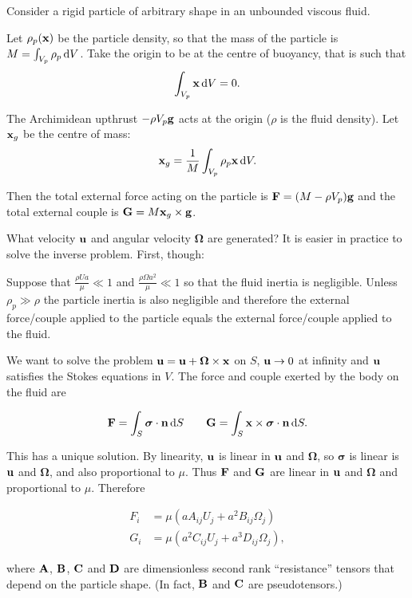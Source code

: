 \documentclass{notes}
\newcommand{\bo}{\boldsymbol{\Omega}}
\newcommand{\bs}{\boldsymbol{\sigma}}
\theoremstyle{plain}
\begin{document}
Consider a rigid particle of arbitrary shape in an unbounded viscous
fluid.

\vspace{1in}

Let $\rho_p(\mathbf{x})$ be the particle density, so that the mass of the
particle is $M = \int_{V_p} \rho_p\, \mathrm{d} V$.  Take the origin to
be at the centre of buoyancy, that is such that
\[
\int_{V_p} \mathbf{x}\, \mathrm{d} V = 0.
\]

The Archimidean upthrust $-\rho V_p \mathbf{g}$ acts at the origin
($\rho$ is the fluid density).  Let $\mathbf{x}_g$ be the centre of mass:
\[
\mathbf{x}_g = \frac{1}{M} \int_{V_p} \rho_p \mathbf{x}\, \mathrm{d} V.
\]

Then the total external force acting on the particle is
$\mathbf{F} = (M - \rho V_p) \mathbf{g}$
and the total external couple is $\mathbf{G} = M \mathbf{x}_g \times \mathbf{g}$.

What velocity $\mathbf{u}$ and angular velocity $\bo$ are generated?  It
is easier in practice to solve the inverse problem.  First, though:

Suppose that $\frac{\rho U a}{\mu} \ll 1$ and $\frac{\rho \Omega a^2}{\mu}
\ll 1$ so that the fluid inertia is negligible.  Unless $\rho_p \gg \rho$
the particle inertia is also negligible and therefore
the external force/couple applied to the particle equals the
external force/couple applied to the fluid.

\vspace{1in}

We want to solve the problem $\vu = \vu + \bo \times \vx$ on $S$,
$\mathbf{u} \to 0$ at infinity and $\mathbf{u}$ satisfies the Stokes equations in $V$.
The force and couple exerted by the body on the fluid are

\[
\vF = \int_S \bs \cdot \vn\, \ud S \qquad \vect{G} = \int_S
\vx \times \bs \cdot \vn\, \ud S.
\]

This has a unique solution.  By linearity, $\mathbf{u}$ is linear in $\mathbf{u}$
and $\bo$, so $\bs$ is linear is $\mathbf{u}$ and $\bo$, and also proportional
to $\mu$. Thus $\mathbf{F}$ and $\mathbf{G}$ are linear in $\mathbf{u}$ and $\bo$ and
proportional to $\mu$.  Therefore

\begin{align*}
F_i &= \mu \left( a A_{i j} U_j + a^2 B_{i j} \Omega_j \right) \\
G_i &= \mu \left( a^2 C_{i j} U_j + a^3 D_{i j} \Omega_j \right),
\end{align*}

where $\mathbf{A}$, $\mathbf{B}$, $\mathbf{C}$ and $\mathbf{D}$ are dimensionless
second rank ``resistance'' tensors that depend on the particle shape. (In fact,
$\mathbf{B}$ and $\mathbf{C}$ are pseudotensors.)
\end{document}
